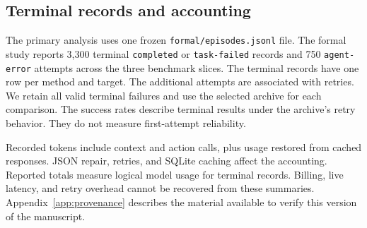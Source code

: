 \subsection{Terminal records and accounting}
The primary analysis uses one frozen \texttt{formal/episodes.jsonl} file. The formal study reports 3,300 terminal \texttt{completed} or \texttt{task-failed} records and 750 \texttt{agent-error} attempts across the three benchmark slices. The terminal records have one row per method and target. The additional attempts are associated with retries. We retain all valid terminal failures and use the selected archive for each comparison. The success rates describe terminal results under the archive's retry behavior. They do not measure first-attempt reliability.

Recorded tokens include context and action calls, plus usage restored from cached responses. JSON repair, retries, and SQLite caching affect the accounting. Reported totals measure logical model usage for terminal records. Billing, live latency, and retry overhead cannot be recovered from these summaries. Appendix~\ref{app:provenance} describes the material available to verify this version of the manuscript.
